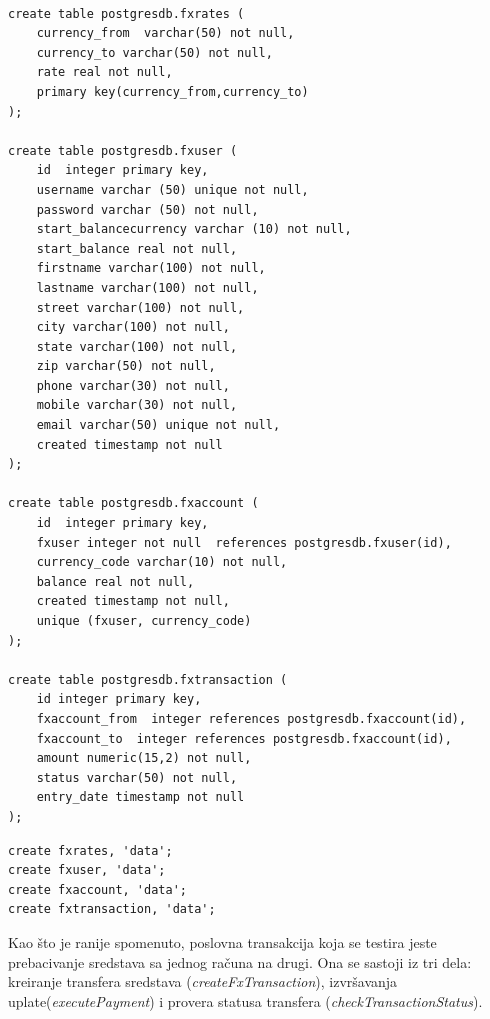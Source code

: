 \documentclass[12pt,oneside]{memoir}
\begin{document}

\begin{lstlisting}[title={setup-postgres-model.sql - Kreiranje PostgreSQL modela},captionpos=b]

create table postgresdb.fxrates (
	currency_from  varchar(50) not null,
	currency_to varchar(50) not null,
	rate real not null,
	primary key(currency_from,currency_to)
);

create table postgresdb.fxuser (
	id  integer primary key,
	username varchar (50) unique not null,
	password varchar (50) not null,
	start_balancecurrency varchar (10) not null,
	start_balance real not null,
	firstname varchar(100) not null,
	lastname varchar(100) not null,
	street varchar(100) not null,
	city varchar(100) not null,
	state varchar(100) not null,
	zip varchar(50) not null,
	phone varchar(30) not null,
	mobile varchar(30) not null,
	email varchar(50) unique not null,
	created timestamp not null
);

create table postgresdb.fxaccount (
	id  integer primary key,
	fxuser integer not null  references postgresdb.fxuser(id),
	currency_code varchar(10) not null,
	balance real not null,
	created timestamp not null,
	unique (fxuser, currency_code)
);

create table postgresdb.fxtransaction (
	id integer primary key,
	fxaccount_from  integer references postgresdb.fxaccount(id),
	fxaccount_to  integer references postgresdb.fxaccount(id),
	amount numeric(15,2) not null,
	status varchar(50) not null,
	entry_date timestamp not null
);

\end{lstlisting}

\begin{lstlisting}[title={setup-hbase-model.sh - Kreiranje HBase modela},captionpos=b]
create fxrates, 'data';
create fxuser, 'data';
create fxaccount, 'data';
create fxtransaction, 'data';
\end{lstlisting}

Kao što je ranije spomenuto, poslovna transakcija koja se testira jeste prebacivanje sredstava sa jednog računa na drugi.  Ona se sastoji iz tri dela: kreiranje transfera sredstava (\textit{createFxTransaction}), izvršavanja uplate(\textit{executePayment}) i provera 
statusa transfera (\textit{checkTransactionStatus}).
\end{document}
